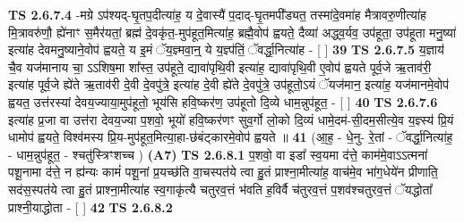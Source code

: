 \documentclass[17pt]{extarticle}
\begin{document}
                  \newline
                                \textbf{ TS 2.6.7.4} \newline
                  -मग्रे ऽप॑श्यद्-घृ॒तप॒दीत्या॑ह॒ य दे॒वास्यै॑ प॒दाद्-घृ॒तमपी᳚ड्यत॒ तस्मा॑दे॒वमा॑ह मैत्रावरु॒णीत्या॑ह मि॒त्रावरु॑णौ॒ ह्ये॑नाꣳ स॒मैर॑यतां॒ ब्रह्म॑ दे॒वकृ॑त॒-मुप॑हूत॒मित्या॑ह॒ ब्रह्मै॒वोप॑ ह्वयते॒ दैव्या॑ अद्ध्व॒र्यव॒ उप॑हूता॒ उप॑हूता मनु॒ष्या॑ इत्या॑ह देवमनु॒ष्याने॒वोप॑ ह्वयते॒ य इ॒मं ॅय॒ज्ञ्मवा॒न्॒ ये य॒ज्ञ्प॑तिं॒ ॅवर्द्धा॒नित्या॑ह - [  ] \textbf{  39} \newline
                  \newline
                                \textbf{ TS 2.6.7.5} \newline
                  य॒ज्ञाय॑ चै॒व यज॑मानाय चा॒ ऽऽशिष॒मा शा᳚स्त॒ उप॑हूते॒ द्यावा॑पृथि॒वी इत्या॑ह॒ द्यावा॑पृथि॒वी ए॒वोप॑ ह्वयते पूर्व॒जे ऋ॒ताव॑री॒ इत्या॑ह पूर्व॒जे ह्ये॑ते ऋ॒ताव॑री दे॒वी दे॒वपु॑त्रे॒ इत्या॑ह दे॒वी ह्ये॑ते दे॒वपु॑त्रे॒ उप॑हूतो॒ऽयं ॅयज॑मान॒ इत्या॑ह॒ यज॑मानमे॒वोप॑ ह्वयत॒ उत्त॑रस्यां देवय॒ज्याया॒मुप॑हूतो॒ भूय॑सि हवि॒ष्कर॑ण॒ उप॑हूतो दि॒व्ये धाम॒न्नुप॑हूत॒ - [  ] \textbf{  40} \newline
                  \newline
                                \textbf{ TS 2.6.7.6} \newline
                  इत्या॑ह प्र॒जा वा उत्त॑रा देवय॒ज्या प॒शवो॒ भूयो॑ हवि॒ष्कर॑णꣳ सुव॒र्गो लो॒को दि॒व्यं धामे॒दम॑-सी॒दम॒सीत्ये॒व य॒ज्ञ्स्य॑ प्रि॒यं धामोप॑ ह्वयते॒ विश्व॑मस्य प्रि॒य-मुप॑हूत॒मित्या॒हा-छ॑बंट्कारमे॒वोप॑ ह्वयते ॥ \textbf{  41} \newline
                  \newline
                      (आ॒ह॒ - धे॒नु- रे॒तां - ॅवर्द्धा॒नित्या॑ह॒ - धाम॒न्नुप॑हूत॒ - श्चतु॑स्त्रिꣳशच्च )  \textbf{(A7)} \newline \newline
                                        \textbf{ TS 2.6.8.1} \newline
                  प॒शवो॒ वा इडा᳚ स्व॒यमा द॑त्ते॒ काम॑मे॒वाऽऽत्मना॑ पशू॒नामा द॑त्ते॒ न ह्य॑न्यः कामं॑ पशू॒नां प्र॒यच्छ॑ति वा॒चस्पत॑ये त्वा हु॒तं प्राश्ना॒मीत्या॑ह॒ वाच॑मे॒व भा॑ग॒धेये॑न प्रीणाति॒ सद॑स॒स्पत॑ये त्वा हु॒तं प्राश्ना॒मीत्या॑ह स्व॒गाकृ॑त्यै चतुरव॒त्तं भ॑वति ह॒विर्वै च॑तुरव॒त्तं प॒शव॑श्चतुरव॒त्तं ॅयद्धोता᳚ प्राश्नी॒याद्धोता - [  ] \textbf{  42} \newline
                  \newline
                                \textbf{ TS 2.6.8.2} \newline
\end{document}
